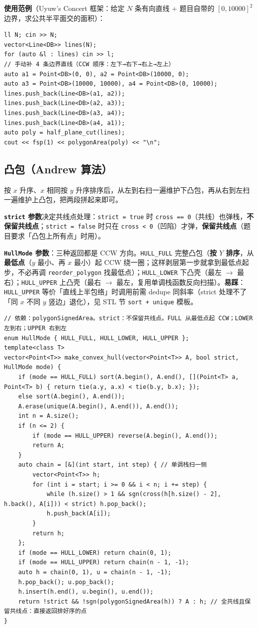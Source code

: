 		\textbf{使用范例}（Uyuw's Concert 框架：给定 $N$ 条有向直线 + 题目自带的 $[0, 10000]^2$ 边界，求公共半平面交的面积）：

		\begin{verbatim}
ll N; cin >> N;
vector<Line<DB>> lines(N);
for (auto &l : lines) cin >> l;
// 手动补 4 条边界直线（CCW 顺序：左下→右下→右上→左上）
auto a1 = Point<DB>(0, 0), a2 = Point<DB>(10000, 0);
auto a3 = Point<DB>(10000, 10000), a4 = Point<DB>(0, 10000);
lines.push_back(Line<DB>(a1, a2));
lines.push_back(Line<DB>(a2, a3));
lines.push_back(Line<DB>(a3, a4));
lines.push_back(Line<DB>(a4, a1));
auto poly = half_plane_cut(lines);
cout << fsp(1) << polygonArea(poly) << "\n";
		\end{verbatim}

		\subsection{凸包（Andrew 算法）}

		按 $x$ 升序、$x$ 相同按 $y$ 升序排序后，从左到右扫一遍维护下凸包，再从右到左扫一遍维护上凸包，把两段拼起来即可。

		\textbf{\texttt{strict} 参数}决定共线点处理：\texttt{strict = true} 时 \texttt{cross == 0}（共线）也弹栈，\textbf{不保留共线点}；\texttt{strict = false} 时只在 \texttt{cross < 0}（凹陷）才弹，\textbf{保留共线点}（题目要求「凸包上所有点」时用）。

		\textbf{\texttt{HullMode} 参数}：三种返回都是 CCW 方向。\texttt{HULL\_FULL} 完整凸包（\textbf{按 $Y$ 排序}，从\textbf{最低点}（$y$ 最小、再 $x$ 最小）起 CCW 绕一圈；这样剥层第一步就拿到最低点起步，不必再调 \texttt{reorder\_polygon} 找最低点）；\texttt{HULL\_LOWER} 下凸壳（最左 $\to$ 最右）；\texttt{HULL\_UPPER} 上凸壳（最右 $\to$ 最左，复用单调栈函数反向扫描）。\textbf{易踩}：\texttt{HULL\_UPPER} 等价「直线上半包络」时调用前需 dedupe 同斜率（strict 处理不了「同 $x$ 不同 $y$ 竖边」退化），见 STL 节 \texttt{sort + unique} 模板。

\begin{verbatim}
// 依赖：polygonSignedArea。strict：不保留共线点。FULL 从最低点起 CCW；LOWER 左到右；UPPER 右到左
enum HullMode { HULL_FULL, HULL_LOWER, HULL_UPPER };
template<class T>
vector<Point<T>> make_convex_hull(vector<Point<T>> A, bool strict, HullMode mode) {
	if (mode == HULL_FULL) sort(A.begin(), A.end(), [](Point<T> a, Point<T> b) { return tie(a.y, a.x) < tie(b.y, b.x); });
	else sort(A.begin(), A.end());
	A.erase(unique(A.begin(), A.end()), A.end());
	int n = A.size();
	if (n <= 2) {
		if (mode == HULL_UPPER) reverse(A.begin(), A.end());
		return A;
	}
	auto chain = [&](int start, int step) { // 单调栈扫一侧
		vector<Point<T>> h;
		for (int i = start; i >= 0 && i < n; i += step) {
			while (h.size() > 1 && sgn(cross(h[h.size() - 2], h.back(), A[i])) < strict) h.pop_back();
			h.push_back(A[i]);
		}
		return h;
	};
	if (mode == HULL_LOWER) return chain(0, 1);
	if (mode == HULL_UPPER) return chain(n - 1, -1);
	auto h = chain(0, 1), u = chain(n - 1, -1);
	h.pop_back(); u.pop_back();
	h.insert(h.end(), u.begin(), u.end());
	return !strict && !sgn(polygonSignedArea(h)) ? A : h; // 全共线且保留共线点：直接返回排好序的点
}
\end{verbatim}

